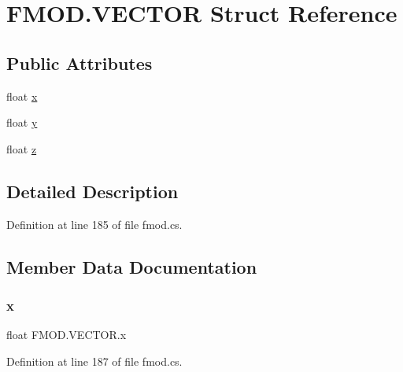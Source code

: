 \hypertarget{struct_f_m_o_d_1_1_v_e_c_t_o_r}{}\section{F\+M\+O\+D.\+V\+E\+C\+T\+OR Struct Reference}
\label{struct_f_m_o_d_1_1_v_e_c_t_o_r}
\subsection*{Public Attributes}
\begin{DoxyCompactItemize}
\item 
float \hyperlink{struct_f_m_o_d_1_1_v_e_c_t_o_r_acb8eee757dd2507b2d168e603775f02b}{x}
\item 
float \hyperlink{struct_f_m_o_d_1_1_v_e_c_t_o_r_ad8f9191fac546af1467d045c98490531}{y}
\item 
float \hyperlink{struct_f_m_o_d_1_1_v_e_c_t_o_r_adbde8f01955fb7b1dcba6f11a067e3d2}{z}
\end{DoxyCompactItemize}


\subsection{Detailed Description}


Definition at line 185 of file fmod.\+cs.



\subsection{Member Data Documentation}
\mbox{\label{struct_f_m_o_d_1_1_v_e_c_t_o_r_acb8eee757dd2507b2d168e603775f02b}} 
\subsubsection{\texorpdfstring{x}{x}}
{\footnotesize\ttfamily float F\+M\+O\+D.\+V\+E\+C\+T\+O\+R.\+x}



Definition at line 187 of file fmod.\+cs.

\mbox{\label{struct_f_m_o_d_1_1_v_e_c_t_o_r_ad8f9191fac546af1467d045c98490531}} 
